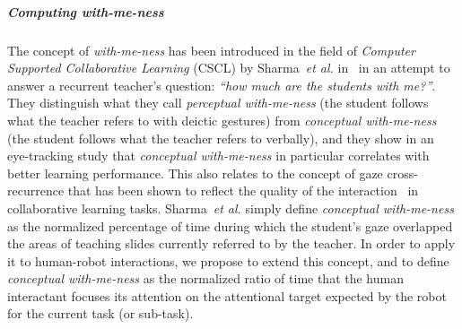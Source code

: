 \documentclass[10pt,a4paper]{article}
\newcommand{\etal}{\textit{et al.}\xspace}
\begin{document}
\subparagraph{Computing with-me-ness}
The concept of \emph{with-me-ness} has been introduced in the field of
\emph{Computer Supported Collaborative Learning} (CSCL) by Sharma~\etal
in~\cite{sharma2014me} in an attempt to
answer a recurrent teacher's question: {\it ``how much are the students with
me?''}. They distinguish what they call \emph{perceptual with-me-ness} (the
student follows what the teacher refers to with deictic gestures) from
\emph{conceptual with-me-ness} (the student follows what the teacher refers to
verbally), and they show in an eye-tracking study that \emph{conceptual
with-me-ness} in particular correlates with better learning performance. This
also relates to the concept of gaze cross-recurrence that has been shown to
reflect the quality of the interaction~\cite{jermann2012effects} in
collaborative learning tasks. Sharma~\etal simply define \emph{conceptual with-me-ness} as the normalized
percentage of time during which the student's gaze overlapped the areas of
teaching slides currently referred to by the teacher.  In order to apply it to
human-robot interactions, we propose to extend this concept, and to define
\emph{conceptual with-me-ness} as the normalized ratio of time that the human
interactant focuses its attention on the attentional target expected by the
robot for the current task (or sub-task).
\end{document}
